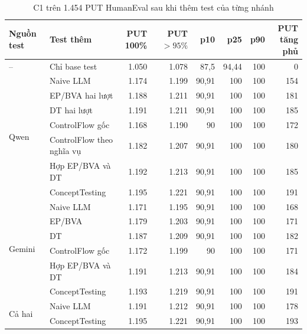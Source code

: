 \begin{table}[!htbp]
\centering
\caption{C1 trên 1.454 PUT HumanEval sau khi thêm test của từng nhánh}
\label{tab:coverage-he-c1}
\small
\begin{tabular*}{\linewidth}{@{\extracolsep{\fill}}llrrrrrr@{}}
\toprule
Nguồn test & Test thêm & \shortstack{PUT\\100\%} & \shortstack{PUT\\$>95\%$} & p10 & p25 & p90 & \shortstack{PUT\\tăng phủ} \\
\midrule
-- & Chỉ base test & 1.050 & 1.078 & 87,5 & 94,44 & 100 & 0 \\
\midrule
\multirow{7}{*}{Qwen} & Naive LLM & 1.174 & 1.199 & 90,91 & 100 & 100 & 154 \\
& EP/BVA hai lượt & 1.188 & 1.211 & 90,91 & 100 & 100 & 181 \\
& DT hai lượt & 1.191 & 1.211 & 90,91 & 100 & 100 & 185 \\
& ControlFlow gốc & 1.168 & 1.190 & 90 & 100 & 100 & 172 \\
& ControlFlow theo nghĩa vụ & 1.182 & 1.207 & 90,91 & 100 & 100 & 180 \\
& Hợp EP/BVA và DT & 1.192 & 1.213 & 90,91 & 100 & 100 & 185 \\
& ConceptTesting & 1.195 & 1.221 & 90,91 & 100 & 100 & 191 \\
\midrule
\multirow{6}{*}{Gemini} & Naive LLM & 1.171 & 1.195 & 90,91 & 100 & 100 & 168 \\
& EP/BVA & 1.179 & 1.203 & 90,91 & 100 & 100 & 171 \\
& DT & 1.187 & 1.209 & 90,91 & 100 & 100 & 182 \\
& ControlFlow gốc & 1.172 & 1.199 & 90 & 100 & 100 & 171 \\
& Hợp EP/BVA và DT & 1.191 & 1.213 & 90,91 & 100 & 100 & 184 \\
& ConceptTesting & 1.193 & 1.219 & 90,91 & 100 & 100 & 191 \\
\midrule
\multirow{2}{*}{Cả hai} & Naive LLM & 1.191 & 1.212 & 90,91 & 100 & 100 & 178 \\
& ConceptTesting & 1.195 & 1.221 & 90,91 & 100 & 100 & 193 \\
\bottomrule
\end{tabular*}
\end{table}
